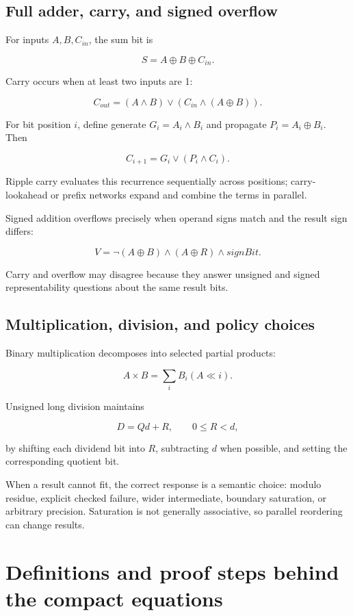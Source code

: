 \subsection{Full adder, carry, and signed overflow}\label{01-foundations-i-ch011-full-adder-carry-and-signed-overflow}

For inputs \(A,B,C_{in}\), the sum bit is

\[
S=A\oplus B\oplus C_{in}.
\]

Carry occurs when at least two inputs are 1:

\[
C_{out}=(A\land B)\lor(C_{in}\land(A\oplus B)).
\]

For bit position \(i\), define generate \(G_i=A_i\land B_i\) and propagate \(P_i=A_i\oplus B_i\). Then

\[
C_{i+1}=G_i\lor(P_i\land C_i).
\]

Ripple carry evaluates this recurrence sequentially across positions; carry-lookahead or prefix networks expand and combine the terms in parallel.

Signed addition overflows precisely when operand signs match and the result sign differs:

\[
V=\neg(A\oplus B)\land(A\oplus R)\land signBit.
\]

Carry and overflow may disagree because they answer unsigned and signed representability questions about the same result bits.

\subsection{Multiplication, division, and policy choices}\label{01-foundations-i-ch011-multiplication-division-and-policy-choices}

Binary multiplication decomposes into selected partial products:

\[
A\times B=\sum_i B_i(A\ll i).
\]

Unsigned long division maintains

\[
D=Qd+R,\qquad 0\le R<d,
\]

by shifting each dividend bit into \(R\), subtracting \(d\) when possible, and setting the corresponding quotient bit.

When a result cannot fit, the correct response is a semantic choice: modulo residue, explicit checked failure, wider intermediate, boundary saturation, or arbitrary precision. Saturation is not generally associative, so parallel reordering can change results.

\section{Definitions and proof steps behind the compact equations}\label{01-foundations-i-ch011-definitions-and-proof-steps-behind-the-compact-equations}

